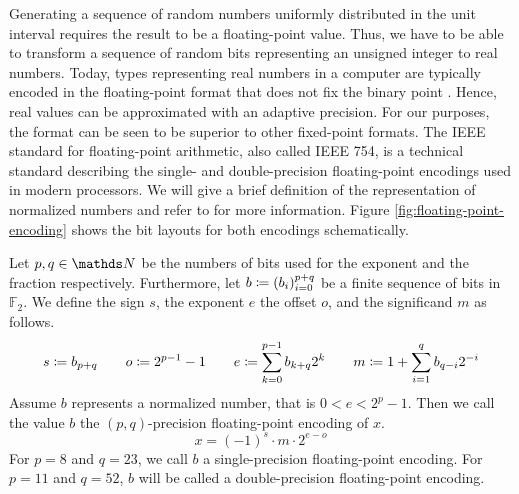 \documentclass{stdlocal}
\begin{document}
    Generating a sequence of random numbers uniformly distributed in the unit interval requires the result to be a floating-point value.
    Thus, we have to be able to transform a sequence of random bits representing an unsigned integer to real numbers.
    Today, types representing real numbers in a computer are typically encoded in the floating-point format that does not fix the binary point \autocite{patterson2014}.
    Hence, real values can be approximated with an adaptive precision.
    For our purposes, the format can be seen to be superior to other fixed-point formats.
    The IEEE standard for floating-point arithmetic, also called IEEE 754, is a technical standard describing the single- and double-precision floating-point encodings used in modern processors.
    We will give a brief definition of the representation of normalized numbers and refer to \textcite[\ppno~196-220]{patterson2014} for more information.
    Figure \ref{fig:floating-point-encoding} shows the bit layouts for both encodings schematically.

    \begin{definition}
      Let $p,q\in\setNatural$ be the numbers of bits used for the exponent and the fraction respectively.
      Furthermore, let $b\coloneqq (b_i)_{i=0}^{p+q}$ be a finite sequence of bits in $\mathds{F}_2$.
      We define the sign $s$, the exponent $e$ the offset $o$, and the significand $m$ as follows.
      \[
        s \coloneqq b_{p+q}
        \qquad
        o \coloneqq 2^{p-1} - 1
        \qquad
        e \coloneqq \sum_{k=0}^{p-1} b_{k+q} 2^{k}
        \qquad
        m \coloneqq 1 + \sum_{i=1}^{q} b_{q-i} 2^{-i}
      \]
      Assume $b$ represents a normalized number, that is $0 < e < 2^p - 1$.
      Then we call the value $b$ the $(p,q)$-precision floating-point encoding of $x$.
      \[
        x = (-1)^s \cdot m \cdot 2^{e-o}
      \]
      For $p=8$ and $q = 23$, we call $b$ a single-precision floating-point encoding.
      For $p=11$ and $q = 52$, $b$ will be called a double-precision floating-point encoding.
    \end{definition}
\end{document}
